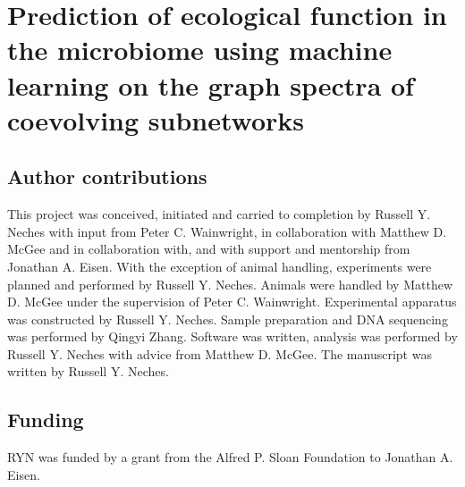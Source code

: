 

\chapter{Prediction of ecological function in the microbiome using machine learning on the graph spectra of coevolving subnetworks}


\section{Author contributions}

This project was conceived, initiated and carried to completion by Russell Y. Neches with input from Peter C. Wainwright, in collaboration with Matthew D. McGee and in collaboration with, and with support and mentorship from Jonathan A. Eisen. With the exception of animal handling, experiments were planned and performed by Russell Y. Neches. Animals were handled by Matthew D. McGee under the supervision of Peter C. Wainwright. Experimental apparatus was constructed by Russell Y. Neches. Sample preparation and DNA sequencing was performed by Qingyi Zhang. Software was written, analysis was performed by Russell Y. Neches with advice from Matthew D. McGee. The manuscript was written by Russell Y. Neches.








\section{Funding}

RYN was funded by a grant from the Alfred P. Sloan Foundation to Jonathan A. Eisen. 

\printbibliography[heading=subbibliography]




